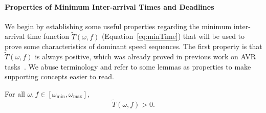 \paragraph{Properties of Minimum Inter-arrival Times and Deadlines}\label{subsec:min-arrival-times}

We begin by establishing some useful properties regarding the minimum inter-arrival time function $\widetilde{T}(\omega, f)$ (Equation~\ref{eq:minTime}) that will be used to prove some characteristics of dominant speed sequences.
 The first property is that $\widetilde{T}(\omega, f)$ is always positive, which was already proved in previous work on AVR tasks~\cite{mohaqeqi_refinement_2017}.
We abuse terminology and refer to some lemmas as properties to make supporting concepts easier to read.

\begin{property} \label{prop:pos-min-interarrival}
For all $\omega, f \in [\omega_{\min}, \omega_{\max}]$,
\begin{equation}\label{eqn:pos-min-interarrival}
    \widetilde{T}(\omega, f) > 0.
\end{equation}
\end{property}

